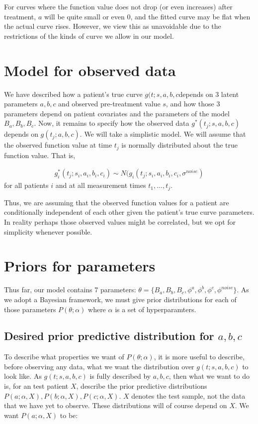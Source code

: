 For curves where the function value does not drop (or even increases) after treatment, $a$ will be quite small or even 0, and the fitted curve may be flat when the actual curve rises.  However, we view this as unavoidable due to the restrictions of the kinds of curve we allow in our model.  

\section{Model for observed data}

We have described how a patient's true curve $g(t;s,a,b,c$depends on 3 latent parameters $a,b,c$ and observed pre-treatment value $s$, and how those 3 parameters depend on patient covariates and the parameters of the model $B_a,B_b,B_c$.  Now, it remains to specify how the observed data $g^*(t_j;s,a,b,c)$ depends on $g(t_j;a,b,c)$.  We will take a simplistic model.  We will assume that the observed function value at time $t_j$ is normally distributed about the true function value.  That is,

\begin{eqnarray}
  g_i^*(t_j;s_i,a_i,b_i,c_i) \sim N(g_i(t_j;s_i,a_i,b_i,c_i, \sigma^{noise})
\end{eqnarray}
for all patients $i$ and at all measurement times $t_1, \ldots, t_j$.

Thus, we are assuming that the observed function values for a patient are conditionally independent of each other given the patient's true curve parameters.  In reality perhaps those observed values might be correlated, but we opt for simplicity whenever possible.

\section{Priors for parameters}

Thus far, our model contains 7 parameters: $\theta = \{B_a,B_b,B_c,\phi^a,\phi^b,\phi^c,\phi^{noise}\}$.  As we adopt a Bayesian framework, we must give prior distributions for each of those parameters $P(\theta;\alpha)$ where $\alpha$ is a set of hyperparamters.

\subsection{Desired prior predictive distribution for $a,b,c$}

To describe what properties we want of $P(\theta;\alpha)$, it is more useful to describe, before observing any data, what we want the distribution over $g(t;s,a,b,c)$ to look like.  As $g(t;s,a,b,c)$ is fully described by $a,b,c$, then what we want to do is, for an test patient $X$, describe the prior predictive distributions $P(a;\alpha,X), P(b;\alpha,X), P(c;\alpha,X)$.  $X$ denotes the test sample, not the data that we have yet to observe.  These distributions will of course depend on $X$.  We want $P(a;\alpha,X)$ to be:

